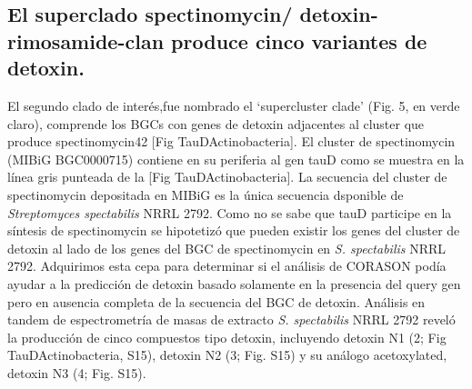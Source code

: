 \documentclass[12pt,twoside]{reedthesis}
\begin{document}
  \subsection{El superclado spectinomycin/ detoxin-rimosamide-clan produce
  cinco variantes de
  detoxin.}\label{el-superclado-spectinomycin-detoxin-rimosamide-clan-produce-cinco-variantes-de-detoxin.}
  
  El segundo clado de interés,fue nombrado el `supercluster clade' (Fig.
  5, en verde claro), comprende los BGCs con genes de detoxin adjacentes
  al cluster que produce spectinomycin42 {[}Fig TauDActinobacteria{]}. El
  cluster de spectinomycin (MIBiG BGC0000715) contiene en su periferia al
  gen tauD como se muestra en la línea gris punteada de la {[}Fig
  TauDActinobacteria{]}. La secuencia del cluster de spectinomycin
  depositada en MIBiG es la única secuencia dsponible de
  \emph{Streptomyces spectabilis} NRRL 2792. Como no se sabe que tauD
  participe en la síntesis de spectinomycin se hipotetizó que pueden
  existir los genes del cluster de detoxin al lado de los genes del BGC de
  spectinomycin en \emph{S. spectabilis} NRRL 2792. Adquirimos esta cepa
  para determinar si el análisis de CORASON podía ayudar a la predicción
  de detoxin basado solamente en la presencia del query gen pero en
  ausencia completa de la secuencia del BGC de detoxin. Análisis en tandem
  de espectrometría de masas de extracto \emph{S. spectabilis} NRRL 2792
  reveló la producción de cinco compuestos tipo detoxin, incluyendo
  detoxin N1 (2; Fig TauDActinobacteria, S15), detoxin N2 (3; Fig. S15) y
  su análogo acetoxylated, detoxin N3 (4; Fig. S15).
  
\end{document}
